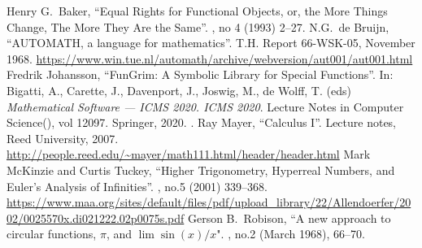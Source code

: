 \begin{thebibliography}{99}\setlength{\parskip}{0pt}
  \setlength{\itemsep}{0pt plus 0.3ex}%
{}
  Henry G.~Baker,
  ``Equal Rights for Functional Objects, or, the More Things Change, The More They Are the Same''.
   , no 4 (1993)
  2--27.\newline
  {\tt{}}
  N.G.~de Bruijn,
  ``AUTOMATH, a language for mathematics''.
  T.H. Report 66-WSK-05, November 1968.\newline
  \url{https://www.win.tue.nl/automath/archive/webversion/aut001/aut001.html}
  Fredrik Johansson,
  ``FunGrim: A Symbolic Library for Special Functions''.
  In: Bigatti, A., Carette, J., Davenport, J., Joswig, M., de Wolff, T.
  (eds)
  \textit{Mathematical Software --- ICMS 2020. ICMS 2020}.
  Lecture Notes in Computer Science(), vol 12097. Springer, 2020.\newline
  {\tt{}}.
  Ray Mayer,
  ``Calculus I''.
  Lecture notes, Reed University, 2007.\newline
  \url{http://people.reed.edu/~mayer/math111.html/header/header.html}
 Mark McKinzie and Curtis Tuckey,
  ``Higher Trigonometry, Hyperreal Numbers, and Euler's Analysis of Infinities''.
   , no.5 (2001) 339--368.\newline
\url{https://www.maa.org/sites/default/files/pdf/upload_library/22/Allendoerfer/2002/0025570x.di021222.02p0075s.pdf}
 Gerson B.~Robison,
  ``A new approach to circular functions, $\pi$, and $\lim\sin(x)/x$".
   , no.2 (March 1968), 66--70.\newline
{\tt{}}
\end{thebibliography}
